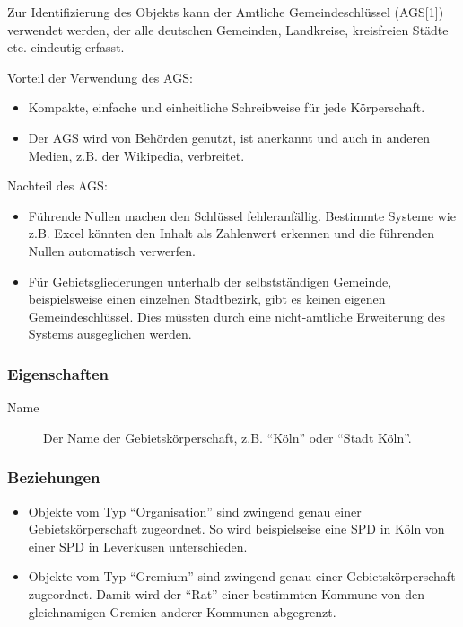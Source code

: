 \documentclass[,a4paper]{article}
\begin{document}
Zur Identifizierung des Objekts kann der Amtliche Gemeindeschlüssel
(AGS{[}1{]}) verwendet werden, der alle deutschen Gemeinden, Landkreise,
kreisfreien Städte etc. eindeutig erfasst.

Vorteil der Verwendung des AGS:

\begin{itemize}
\item
  Kompakte, einfache und einheitliche Schreibweise für jede
  Körperschaft.
\item
  Der AGS wird von Behörden genutzt, ist anerkannt und auch in anderen
  Medien, z.B. der Wikipedia, verbreitet.
\end{itemize}

Nachteil des AGS:

\begin{itemize}
\item
  Führende Nullen machen den Schlüssel fehleranfällig. Bestimmte Systeme
  wie z.B. Excel könnten den Inhalt als Zahlenwert erkennen und die
  führenden Nullen automatisch verwerfen.
\item
  Für Gebietsgliederungen unterhalb der selbstständigen Gemeinde,
  beispielsweise einen einzelnen Stadtbezirk, gibt es keinen eigenen
  Gemeindeschlüssel. Dies müssten durch eine nicht-amtliche Erweiterung
  des Systems ausgeglichen werden.
\end{itemize}

\subsubsection{Eigenschaften}

\begin{description}
\item[Name]
Der Name der Gebietskörperschaft, z.B. ``Köln'' oder ``Stadt Köln''.
\end{description}

\subsubsection{Beziehungen}

\begin{itemize}
\item
  Objekte vom Typ ``Organisation'' sind zwingend genau einer
  Gebietskörperschaft zugeordnet. So wird beispielseise eine SPD in Köln
  von einer SPD in Leverkusen unterschieden.
\item
  Objekte vom Typ ``Gremium'' sind zwingend genau einer
  Gebietskörperschaft zugeordnet. Damit wird der ``Rat'' einer
  bestimmten Kommune von den gleichnamigen Gremien anderer Kommunen
  abgegrenzt.
\end{itemize}
\end{document}
